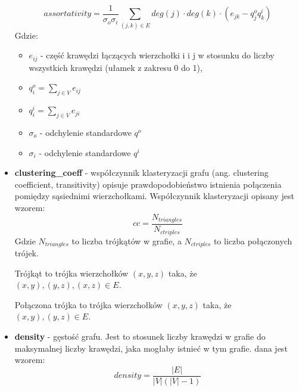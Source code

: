 \begin{itemize}
            $$ assortativity = \frac{1}{\sigma_o \sigma_i} \sum_{(j,k)\in{E}} deg(j) \cdot deg(k) \cdot (e_{jk} - q_j^o q_k^i) $$
            Gdzie:
            \begin{itemize}
                  \item $e_{ij}$ - część krawędzi łączących wierzchołki i i j w stosunku do liczby wszystkich krawędzi (ułamek z zakresu 0 do 1),
                  \item $q_i^o = \sum_{j \in V} e_{ij}$
                  \item $q_i^i = \sum_{j \in V} e_{ji}$
                  \item $\sigma_o$ - odchylenie standardowe $q^o$
                  \item $\sigma_i$ - odchylenie standardowe $q^i$
            \end{itemize}
      \item \textbf{clustering\_coeff} - współczynnik klasteryzacji grafu (ang. clustering coefficient, transitivity) opisuje prawdopodobieństwo istnienia połączenia pomiędzy sąsiednimi wierzchołkami.
            Współczynnik klasteryzacji opisany jest wzorem:
            $$cc = \frac{N_{triangles}}{N_{ctriples}}$$
            Gdzie $N_{triangles}$ to liczba trójkątów w grafie, a $N_{ctriples}$ to liczba połączonych trójek.

            Trójkąt to trójka wierzchołków $(x,y,z)$ taka, że $(x,y), (y,z), (x,z) \in E$.

            Połączona trójka to trójka wierzchołków $(x,y,z)$ taka, że $(x,y), (y,z) \in E$.

      \item \textbf{density} - gęstość grafu. Jest to stosunek liczby krawędzi w grafie do maksymalnej liczby krawędzi, jaka mogłaby istnieć w tym grafie.
            dana jest wzorem:
            $$density = \frac{|E|}{|V|(|V|-1)}$$


\end{itemize}
